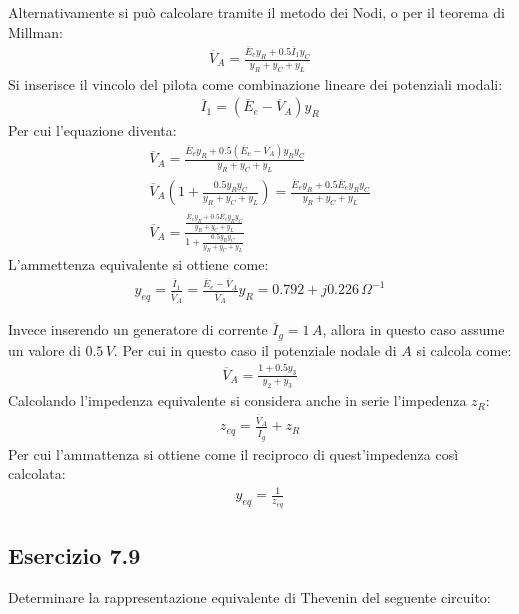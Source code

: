 \documentclass{article}
\begin{document}
Alternativamente si può calcolare tramite il metodo dei Nodi, o per il teorema di Millman:
\begin{gather*}
    \overline{V}_A=\displaystyle\frac{\overline{E}_ey_R+0.5\overline{I}_1y_C}{y_R+y_C+y_L}
\end{gather*}
Si inserisce il vincolo del pilota come combinazione lineare dei potenziali modali:
\begin{gather*}
    \overline{I}_1=(\overline{E}_e-\overline{V}_A)y_R
\end{gather*}
Per cui l'equazione diventa:
\begin{gather*}
    \overline{V}_A=\displaystyle\frac{\overline{E}_ey_R+0.5(\overline{E}_e-\overline{V}_A)y_Ry_C}{y_R+y_C+y_L}\\
    \overline{V}_A\left(1+\displaystyle\frac{0.5y_Ry_C}{y_R+y_C+y_L}\right)=\frac{\overline{E}_ey_R+0.5\overline{E}_ey_Ry_C}{y_R+y_C+y_L}\\
    \overline{V}_A=\displaystyle\frac{\frac{\overline{E}_ey_R+0.5\overline{E}_ey_Ry_C}{y_R+y_C+y_L}}{1+\frac{0.5y_Ry_C}{y_R+y_C+y_L}}
\end{gather*}
L'ammettenza equivalente si ottiene come:
\begin{gather}
    y_{eq}=\displaystyle\frac{\overline{I}_1}{\overline{V}_A}=\frac{\overline{E}_e-\overline{V}_A}{\overline{V}_A}y_R=0.792+j0.226\,\Omega^{-1}
\end{gather}


Invece inserendo un generatore di corrente $\overline{I}_g=1\,A$, allora in questo caso assume un valore di $0.5\,V$. Per cui in questo caso il potenziale nodale di $A$ si 
calcola come:
\begin{gather*}
    \overline{V}_A=\displaystyle\frac{1+0.5y_3}{y_2+y_3}
\end{gather*}
Calcolando l'impedenza equivalente si considera anche in serie l'impedenza $z_R$:
\begin{gather*}
    z_{eq}=\displaystyle\frac{\overline{V}_A}{\overline{I}_g}+z_R
\end{gather*}
Per cui l'ammattenza si ottiene come il reciproco di quest'impedenza così calcolata:
\begin{gather*}
    y_{eq}=\displaystyle\frac{1}{z_{eq}}
\end{gather*}

\subsection{Esercizio 7.9}

Determinare la rappresentazione equivalente di Thevenin del seguente circuito:
\end{document}

